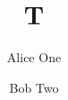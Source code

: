 \documentclass[preprint]{elsarticle}
\begin{document}
\begin{frontmatter}
\title{T}
\author[a]{Alice One}
\author[a]{Bob Two}
\address[a]{Some University}
\end{frontmatter}
\end{document}
